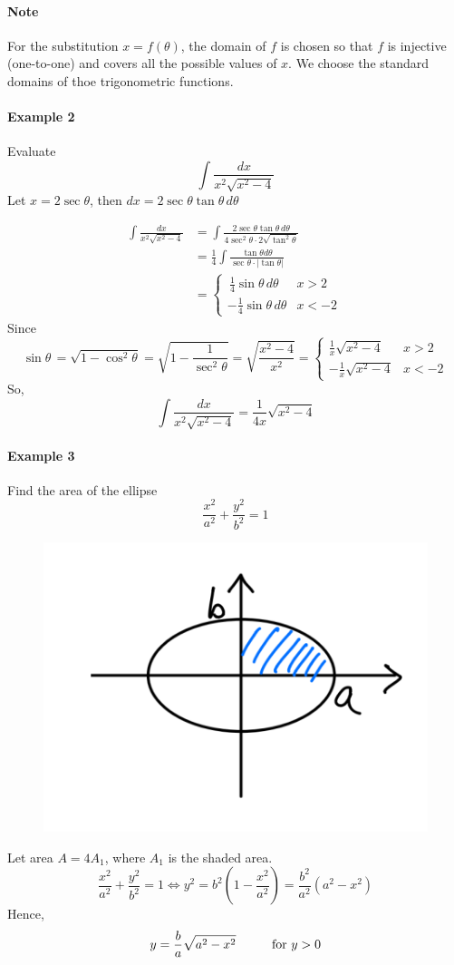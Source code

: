 \documentclass[12pt]{article}
\newcommand\tab[1][1cm]{\hspace*{#1}}
\begin{document}
\paragraph{Note} For the substitution $x = f(\theta)$, the domain of $f$ is chosen so that $f$ is injective (one-to-one) and covers all the possible values of $x$.
We choose the standard domains of thoe trigonometric functions.

\paragraph{Example 2} Evaluate 
\[
    \int \frac{dx}{x^2 \sqrt{x^2 - 4}} 
\]
Let $x = 2\sec \theta$, then $dx = 2\sec \theta \tan \theta \, d\theta$

\begin{align*} 
    \int \frac{dx}{x^2 \sqrt{x^2 - 4}} &= \int \frac{2 \sec \theta \tan \theta \, d\theta}{4 \sec^2 \theta \cdot 2 \sqrt{\tan^2 \theta}} \\
    &= \frac{1}{4} \int \frac{\tan \theta d\theta}{\sec \theta \cdot | \tan \theta |} \\
    &= \begin{cases}\, 
        \frac{1}{4} \sin \theta \, d\theta & x > 2 \\
        - \frac{1}{4} \sin \theta \, d\theta & x < - 2 
    \end{cases}\, 
\end{align*}
Since 
\[
    \sin \theta\, = \sqrt{1 - \cos^2 \theta} = \sqrt{1 - \frac{1}{\sec^2 \theta}} = \sqrt{\frac{x^2 - 4}{x^2}} = \begin{cases} 
        \frac{1}{x} \sqrt{x^2 - 4} & x > 2 \\
        - \frac{1}{x} \sqrt{x^2 - 4} & x < - 2
    \end{cases} 
\]
So,
\[
    \int \frac{dx}{x^2 \sqrt{x^2 - 4}} = \frac{1}{4x} \sqrt{x^2 - 4}
\]
\paragraph{Example 3} Find the area of the ellipse 
\[
    \frac{x^2}{a^2} + \frac{y^2}{b^2} = 1 
\]
\begin{figure}[H]
     \centering
     \includegraphics[width = 0.4 \linewidth]{Images/ellipse area.png}
\end{figure}
Let area $A = 4A_1$, where $A_1$ is the shaded area.
\[
    \frac{x^2}{a^2} + \frac{y^2}{b^2} = 1 \Leftrightarrow y^2 = b^2 (1 - \frac{x^2}{a^2} ) = \frac{b^2}{a^2}(a^2 - x^2) 
\]
Hence, 
\[
    y = \frac{b}{a} \sqrt{a^2 - x^2} \textrm{\tab for } y > 0
\]
\end{document}
